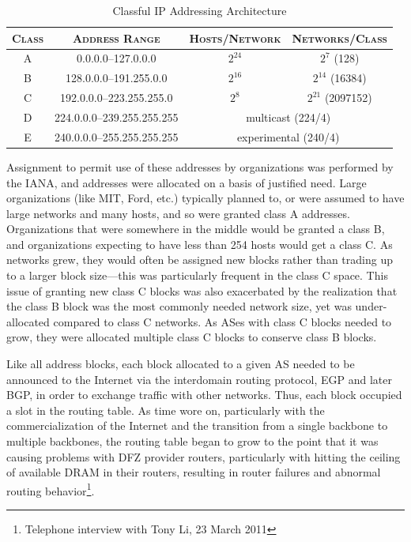 \begin{table}[h]
\begin{centering}
\begin{singlespace}
\begin{tabular}{ c | c | c | c }
    \textsc{Class} & \textsc{Address Range} & \textsc{Hosts/Network} & \textsc{Networks/Class} \\
    \hline
	A & 0.0.0.0--127.0.0.0         & $2^{24}$ & $2^{7}$ (128)               \\
	B & 128.0.0.0--191.255.0.0     & $2^{16}$ & $2^{14}$ (16384)            \\
	C & 192.0.0.0--223.255.255.0   & $2^{8}$  & $2^{21}$ (2097152)          \\
	D & 224.0.0.0--239.255.255.255 & \multicolumn{2}{c}{multicast (224/4)} \\
	E & 240.0.0.0--255.255.255.255 & \multicolumn{2}{c}{experimental (240/4)}
\end{tabular}
\end{singlespace}
\end{centering}
\caption{Classful IP Addressing Architecture \cite{rfc791}}
\end{table}

Assignment to permit use of these addresses by organizations was performed by the IANA, and addresses were allocated on a basis of justified need. Large organizations (like MIT, Ford, etc.) typically planned to, or were assumed to have large networks and many hosts, and so were granted class A addresses. Organizations that were somewhere in the middle would be granted a class B, and organizations expecting to have less than 254 hosts would get a class C. As networks grew, they would often be assigned new blocks rather than trading up to a larger block size---this was particularly frequent in the class C space. This issue of granting new class C blocks was also exacerbated by the realization that the class B block was the most commonly needed network size, yet was under-allocated compared to class C networks. As ASes with class C blocks needed to grow, they were allocated multiple class C blocks to conserve class B blocks.

Like all address blocks, each block allocated to a given AS needed to be announced to the Internet via the interdomain routing protocol, EGP and later BGP, in order to exchange traffic with other networks. Thus, each block occupied a slot in the routing table. As time wore on, particularly with the commercialization of the Internet and the transition from a single backbone to multiple backbones, the routing table began to grow to the point that it was causing problems with DFZ provider routers, particularly with hitting the ceiling of available DRAM in their routers, resulting in router failures and abnormal routing behavior\footnote{Telephone interview with Tony Li, 23 March 2011}.


